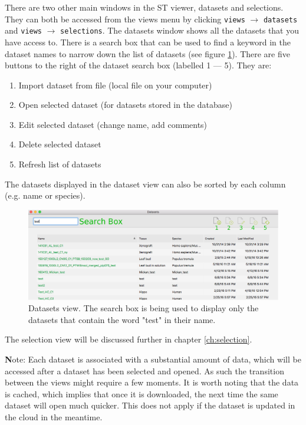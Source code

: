 \documentclass[10pt,a4paper,titlepage]{book}
\begin{document}
There are two other main windows in the ST viewer, datasets and selections. They can both be accessed from the views menu by clicking \texttt{views} $\rightarrow$ \texttt{datasets} and \texttt{views} $\rightarrow$ \texttt{selections}.
The datasets window shows all the datasets that you have access to. There is a search box that can be used to find a keyword in the dataset names to narrow down the list of datasets (see figure \ref{fig:datasets_view}). There are five buttons to the right of the dataset search box (labelled 1 --- 5). They are:
\begin{enumerate}
\item Import dataset from file (local file on your computer)
\item Open selected dataset (for datasets stored in the database)
\item Edit selected dataset (change name, add comments)
\item Delete selected dataset
\item Refresh list of datasets
\end{enumerate}

The datasets displayed in the dataset view can also be sorted by each column (e.g. name or species).
\begin{figure}[h]
	\centering
	\includegraphics[width=0.8\linewidth]{./Pictures/datasets}
	\caption[Datasets view.]{Datasets view. The search box is being used to display only the datasets that contain the word "test" in their name.}
	\label{fig:datasets_view}
\end{figure}

The selection view will be discussed further in chapter \ref{ch:selection}.

{ \textbf Note:} 
Each dataset is associated with a substantial amount of data, which will be accessed after a dataset has been selected and opened. As such the transition between the views might require a few moments. It is worth noting that the data is cached, which implies that once it is downloaded, the next time the same dataset will open much quicker. This does not apply if the dataset is updated in the cloud in the meantime.
\end{document}
